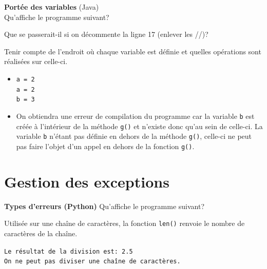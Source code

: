 \begin{Exercice}[10 minutes] \textbf{Portée des variables} (Java) \\
    Qu'affiche le programme suivant?
    
    Que se passerait-il si on décommente la ligne 17 (enlever les //)?

    \begin{conseil}
        Tenir compte de l’endroit où chaque variable est définie et quelles opérations sont réalisées sur celle-ci.
    \end{conseil}

    \begin{solution}
        \begin{itemize}
            \item  
            \lstinline{a = 2} \\
            \lstinline{a = 2} \\
            \lstinline{b = 3} \\ 

            \item On obtiendra une erreur de compilation du programme car la variable \lstinline{b} est créée à l’intérieur de la méthode \lstinline{g()} et n’existe donc qu’au sein de celle-ci. La variable \lstinline{b} n’étant pas définie en dehors de la méthode \lstinline{g()}, celle-ci ne peut pas faire l’objet d’un appel en dehors de la fonction \lstinline{g()}.
        \end{itemize}
        \end{solution}
 \end{Exercice}


\section{Gestion des exceptions}

\begin{Exercice}[5 minutes]  \textbf{Types d'erreurs (Python)} Qu'affiche le programme suivant?\\
      
     \begin{conseil}
        Utilisée sur une chaîne de caractères, la fonction \lstinline{len()} renvoie le nombre de caractères de la chaîne. 
    \end{conseil}
     \begin{solution}
        \lstinline{Le résultat de la division est: 2.5}\\
        \lstinline{On ne peut pas diviser une chaîne de caractères.}
     \end{solution}   
 \end{Exercice}

